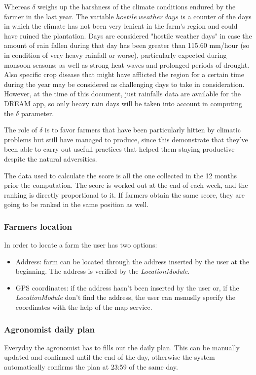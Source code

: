 \documentclass[table, 12pt]{article}
\begin{document}
Whereas $\delta$ weighs up the harshness of the climate conditions endured by the farmer in the last year. The variable $hostile\ weather\ days$ is a counter of the days in which the climate has not been very lenient in the farm's region and could have ruined the plantation. Days are considered "hostile weather days" in case the amount of rain fallen during that day has been greater than 115.60 mm/hour (so in condition of very heavy rainfall or worse), particularly expected during monsoon seasons; as well as strong heat waves and prolonged periods of drought. Also specific crop disease that might have afflicted the region for a certain time during the year may be considered as challenging days to take in consideration. However, at the time of this document, just rainfalls data are available for the DREAM app, so only heavy rain days will be taken into account in computing the $\delta$ parameter.

The role of $\delta$ is to favor farmers that have been particularly hitten by climatic problems but still have managed to produce, since this demonstrate that they've been able to carry out usefull practices that helped them staying productive despite the natural adversities. 

The data used to calculate the score is all the one collected in the 12 months prior the computation. The score is worked out at the end of each week, and the ranking is directly proportional to it. If farmers obtain the same score, they are going to be ranked in the same position as well.

\subsubsection{Farmers location} In order to locate a farm the user has two options:
    \begin{itemize}
        \item Address: farm can be located through the address inserted by the user at the beginning.
        The address is verified by the \textit{LocationModule}.
        \item GPS coordinates: if the address hasn't been inserted by the user or, if the \textit{LocationModule} don't find the address, the user can msnuslly specify the coordinates with the help of the map service.
    \end{itemize}
\subsubsection{Agronomist daily plan} Everyday the agronomist has to fills out the daily plan.
This can be manually updated and confirmed until the end of the day, otherwise the system automatically confirms the plan at 23:59 of the same day.
\end{document}
